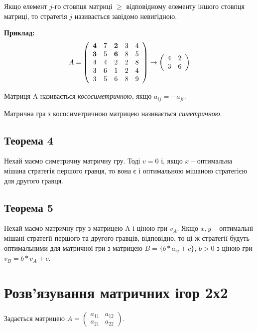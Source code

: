 \documentclass[12pt,a4paper]{book}
\begin{document}
Якщо елемент $j$-го стовпця матриці $\ge$ відповідному елементу іншого стовпця матриці, то стратегія $j$ називається завідомо невигідною.

{\bf Приклад:}
\[ A = \left ( \begin{array}{ccccc}
{\bf 4} & 7 & {\bf 2} & 3 & 4 \\
{\bf 3} & 5 & {\bf 6} & 8 & 5 \\
4 & 4 &  2 & 2 & 8 \\
3 & 6 & 1 & 2 & 4 \\
3 & 5 & 6 & 8 & 9
\end{array} \right ) \to \left (  \begin{array}{cc}
4 & 2 \\
3 & 6
\end{array} \right ) \]

Матриця A називається \emph{кососиметричною}, якщо $a_{ij} = -a_{ji}$.

Матрична гра з кососиметричною матрицею називається \emph{симетричною}.

\subsection{Теорема 4}
Нехай маємо симетричну матричну гру. Тоді $v=0$ і, якщо $x$ -- оптимальна мішана стратегія першого гравця, то вона є і оптимальною мішаною стратегією для другого гравця.
\subsection{Теорема 5}
Нехай маємо матричну гру з матрицею A і ціною гри $v_A$. Якщо $x,y$ -- оптимальні мішані стратегії першого та другого гравців, відповідно, то ці ж стратегії будуть оптимальними для матричної гри з матрицею $B = \{b*a_{ij}+c\}, \, b > 0$ з ціною гри $v_B = b*v_A+c$.

\section{Розв’язування матричних ігор 2х2}

Задається матрицею $A=\left ( \begin{array}{cc}a_{11}&a_{12}\\a_{21}&a_{22}\end{array}\right)$.
\end{document}
